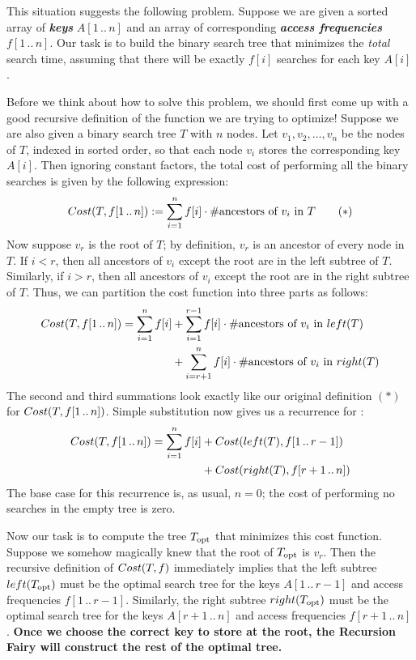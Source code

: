 This situation suggests the following problem.
Suppose we are given a sorted array of \textbf{\textit{keys}} $A[1\,..\,n]$ and an array of corresponding \textbf{\textit{access frequencies}} $f[1\,..\,n]$.
Our task is to build the binary search tree that minimizes the \textit{total} search time, assuming that there will be exactly $f[i]$ searches for each key $A[i]$.

Before we think about how to solve this problem, we should first come up with a good recursive definition of the function we are trying to optimize!
Suppose we are also given a binary search tree $T$ with $n$ nodes.
Let $v_1, v_2, \dots, v_n$ be the nodes of $T$, indexed in sorted order, so that each node $v_i$ stores the corresponding key $A[i]$.
Then ignoring constant factors, the total cost of performing all the binary searches is given by the following expression:
\begin{equation*}
Cost(T, f[1\,..\,n]) := \sum_{i=1}^{n} f[i] \cdot \#\text{ancestors of $v_i$ in $T$} \tag{$*$}
\end{equation*}
Now suppose $v_r$ is the root of $T$; by definition, $v_r$ is an ancestor of every node in $T$.
If $i < r$, then all ancestors of $v_i$ except the root are in the left subtree of $T$.
Similarly, if $i > r$, then all ancestors of $v_i$ except the root are in the right subtree of $T$.
Thus, we can partition the cost function into three parts as follows:
\begin{align*}
Cost(T, f[1\,..\,n]) = \sum_{i=1}^{n} f[i] &+ \sum_{i=1}^{r-1} f[i] \cdot \#\text{ancestors of $v_i$ in $left(T)$}\\
&+ \sum_{i=r+1}^{n} f[i] \cdot \#\text{ancestors of $v_i$ in $right(T)$}
\end{align*}
The second and third summations look exactly like our original definition $(*)$ for $Cost(T, f[1\,..\,n])$.
Simple substitution now gives us a recurrence for :
\begin{align*}
Cost(T, f[1\,..\,n]) = \sum_{i=1}^{n} f[i] &+ Cost(left(T), f[1\,..\,r-1])\\
&+ Cost(right(T), f[r+1\,..\,n])
\end{align*}
The base case for this recurrence is, as usual, $n = 0$; the cost of performing no searches in the empty tree is zero.

Now our task is to compute the tree $T_{\textup{opt}}$ that minimizes this cost function.
Suppose we somehow magically knew that the root of $T_{\textup{opt}}$ is $v_r$.
Then the recursive definition of $Cost(T, f)$ immediately implies that the left subtree $left(T_{\textup{opt}})$ must be the optimal search tree for the keys $A[1\,..\,r-1]$ and access frequencies $f[1\,..\,r-1]$.
Similarly, the right subtree $right(T_{\textup{opt}})$ must be the optimal search tree for the keys $A[r+1\,..\,n]$ and access frequencies $f[r+1\,..\,n]$.
\textbf{Once we choose the correct key to store at the root, the Recursion Fairy will construct the rest of the optimal tree.}

